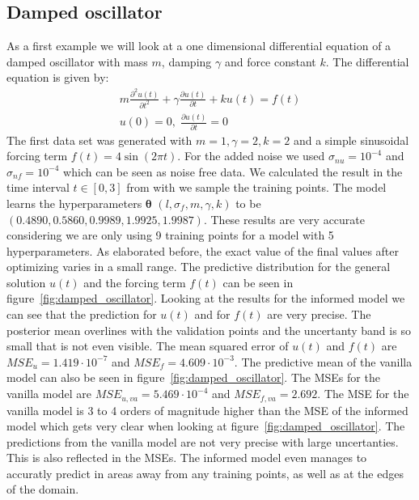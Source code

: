 \documentclass{article}
\begin{document}
\subsection{Damped oscillator}
As a first example we will look at a one dimensional differential equation of a
damped oscillator with mass $m$, damping $\gamma$ and force constant $k$. The
differential equation is given by:
\begin{equation}
    \begin{aligned}
        m\frac{\partial^2 u(t)}{\partial t^2} + \gamma \frac{\partial u(t)}{\partial t} + k u(t) = f(t) \\ u(0) = 0, \; \frac{\partial u(t)}{\partial t} = 0
    \end{aligned}
\end{equation}
The first data set was generated with $m = 1, \gamma = 2, k = 2$ and a simple sinusoidal forcing term $f(t) = 4 \sin(2\pi t)$. For the added noise we used $\sigma_{nu} = 10^{-4}$ and $\sigma_{nf} = 10^{-4}$ which can be seen as noise free data. We calculated the result in the time interval $t \in [0,3]$ from with we sample the training points. The model learns the hyperparameters $\bm{\theta}$ $(l,\sigma_f,m,\gamma,k)$ to be $(0.4890, 0.5860, 0.9989, 1.9925, 1.9987)$. These results are very accurate considering we are only using 9 training points for a model with 5 hyperparameters. As elaborated before, the exact value of the final values after optimizing varies in a small range. The predictive distribution for the general solution $u(t)$ and the forcing term $f(t)$ can be seen in figure~\ref{fig:damped_oscillator}. Looking at the results for the informed model we can see that the prediction for $u(t)$ and for $f(t)$ are very precise. The posterior mean overlines with the validation points and the uncertanty band is so small that is not even visible. The mean squared error of $u(t)$ and $f(t)$ are $MSE_u = 1.419 \cdot 10^{-7}$ and $MSE_f = 4.609 \cdot 10^{-3}$. The predictive mean of the vanilla model can also be seen in figure~\ref{fig:damped_oscillator}. The MSEs for the vanilla model are $MSE_{u,va} = 5.469 \cdot 10^{-4}$ and $MSE_{f,va} = 2.692$. The MSE for the vanilla model is 3 to 4 orders of magnitude higher than the MSE of the informed model which gets very clear when looking at figure~\ref{fig:damped_oscillator}. The predictions from the vanilla model are not very precise with large uncertanties. This is also reflected in the MSEs. The informed model even manages to accuratly predict in areas away from any training points, as well as at the edges of the domain.
\end{document}
